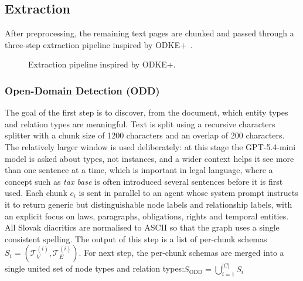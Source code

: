 \documentclass[conference]{IEEEtran}
\begin{document}
\subsection{Extraction}

After preprocessing, the remaining text pages are chunked and passed through a three-step extraction pipeline inspired by ODKE+~\cite{odkeplus2025}.

\begin{figure}[h]
  \centering
\caption{Extraction pipeline inspired by ODKE+.}
\label{fig:extraction}
\end{figure}

\subsubsection{Open-Domain Detection (ODD)}
The goal of the first step is to discover, from the document, which entity types and relation types are meaningful. Text is split using a recursive characters splitter with a chunk size of 1200 characters and an overlap of 200 characters. The relatively larger window is used deliberately: at this stage the GPT-5.4-mini model is asked about types, not instances, and a wider context helps it see more than one sentence at a time, which is important in legal language, where a concept such as \textit{tax base} is often introduced several sentences before it is first used. Each chunk $c_i$ is sent in parallel to an agent whose system prompt instructs it to return generic but distinguishable node labels and relationship labels, with an explicit focus on laws, paragraphs, obligations, rights and temporal entities. All Slovak diacritics are normalised to ASCII so that the graph uses a single consistent spelling. The output of this step is a list of per-chunk schemas $S_i=(\mathcal{T}^{(i)}_V,\mathcal{T}^{(i)}_E)$. For next step, the per-chunk schemas are merged into a single united set of node types and relation types:$S_{\text{ODD}}=\bigcup_{i=1}^{|C|} S_i $
\end{document}
